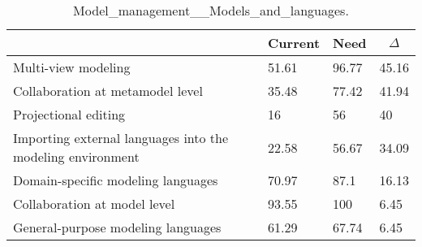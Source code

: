 
  \begin{table*}[]
  \centering
  \notsotiny
  \caption{ Model_management__Models_and_languages.}
\label{tab:model_management__models_and_languages}
\begin{tabular}{|l|l|l|l|}
  \hline
  \rowcolor[HTML]{C0C0C0}
    \multicolumn{1}{|c|}{Feature} & \multicolumn{1}{c|}{Current} & \multicolumn{1}{c|}{Need} & \multicolumn{1}{c|}{$\Delta$} \\ \hline
  Multi-view modeling & 51.61 & 96.77 & 45.16 \\ \hline 
Collaboration at metamodel level & 35.48 & 77.42 & 41.94 \\ \hline 
Projectional editing & 16 & 56 & 40 \\ \hline 
Importing external languages into the modeling environment & 22.58 & 56.67 & 34.09 \\ \hline 
Domain-specific modeling languages & 70.97 & 87.1 & 16.13 \\ \hline 
Collaboration at model level & 93.55 & 100 & 6.45 \\ \hline 
General-purpose modeling languages & 61.29 & 67.74 & 6.45 \\ \hline 
\end{tabular}%
  \end{table*}